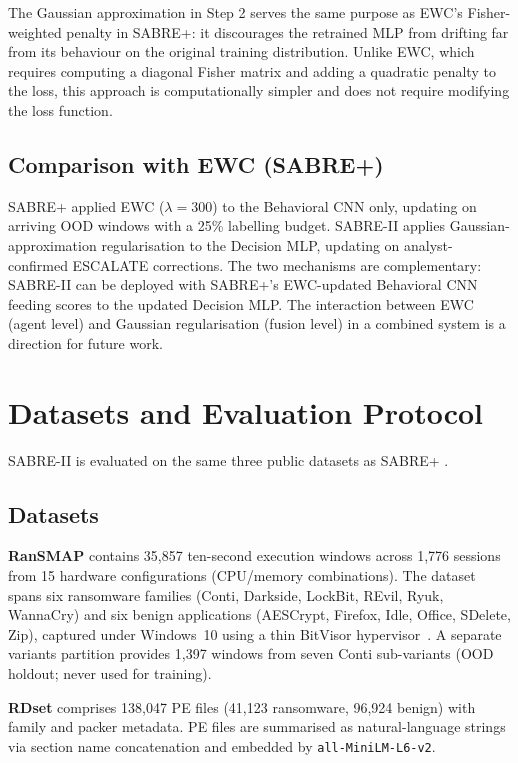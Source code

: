 \documentclass[journal]{IEEEtran}
\begin{document}
The Gaussian approximation in Step 2 serves the same purpose as EWC's
Fisher-weighted penalty in SABRE+: it discourages the retrained MLP from
drifting far from its behaviour on the original training distribution.
Unlike EWC, which requires computing a diagonal Fisher matrix and adding
a quadratic penalty to the loss, this approach is computationally simpler
and does not require modifying the loss function.

\subsection{Comparison with EWC (SABRE+)}

SABRE+ applied EWC ($\lambda = 300$) to the Behavioral CNN only,
updating on arriving OOD windows with a 25\% labelling budget.
SABRE-II applies Gaussian-approximation regularisation to the Decision
MLP, updating on analyst-confirmed ESCALATE corrections.
The two mechanisms are complementary: SABRE-II can be deployed with
SABRE+'s EWC-updated Behavioral CNN feeding scores to the updated Decision
MLP.
The interaction between EWC (agent level) and Gaussian regularisation
(fusion level) in a combined system is a direction for future work.


\section{Datasets and Evaluation Protocol}
\label{sec:datasets}

SABRE-II is evaluated on the same three public datasets as SABRE+
\cite{kabuye_sabre_2026}.

\subsection{Datasets}

\textbf{RanSMAP} \cite{ransmap_2024} contains 35,857 ten-second
execution windows across 1,776 sessions from 15 hardware configurations
(CPU/memory combinations). The dataset spans six ransomware families
(Conti, Darkside, LockBit, REvil, Ryuk, WannaCry) and six benign
applications (AESCrypt, Firefox, Idle, Office, SDelete, Zip), captured
under Windows~10 using a thin BitVisor hypervisor~\cite{hirano2025ransmap}.
A separate variants partition provides 1,397 windows from seven Conti
sub-variants (OOD holdout; never used for training).

\textbf{RDset} \cite{rdset_2021} comprises 138,047 PE files (41,123
ransomware, 96,924 benign) with family and packer metadata.
PE files are summarised as natural-language strings via section name
concatenation and embedded by \texttt{all-MiniLM-L6-v2}.
\end{document}
